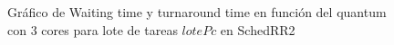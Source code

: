 \begin{figure}[H]
\hfill
{}
\hfill
{}
\hfill
\caption{Gráfico de Waiting time y turnaround time en función del quantum con 3 cores para lote de tareas $lotePc$ en SchedRR2}
\end{figure}

